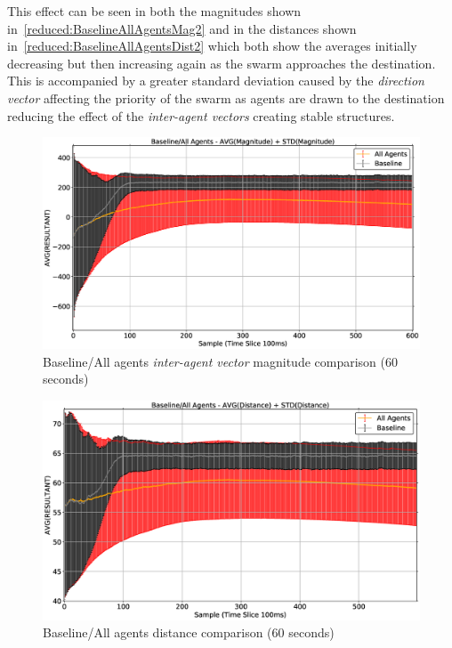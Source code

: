 This effect can be seen in both the magnitudes shown in~\autoref{reduced:BaselineAllAgentsMag2} and in the distances shown in~\autoref{reduced:BaselineAllAgentsDist2} which both show the averages initially decreasing but then increasing again as the swarm approaches the destination. This is accompanied by a greater standard deviation caused by the \textit{direction vector} affecting the priority of the swarm as agents are drawn to the destination reducing the effect of the \textit{inter-agent vectors} creating stable structures.
\begin{figure}[H]
\begin{center}
\includegraphics[width=14cm]{CHAPTER-6/figures/BaselineAllAgentsMag2}
\end{center}
\caption[Baseline/All agents magnitude comparison]{Baseline/All agents \textit{inter-agent vector} magnitude comparison (60 seconds)\label{reduced:BaselineAllAgentsMag2}}
\end{figure}
\begin{figure}[H]
\begin{center}
\includegraphics[width=14cm]{CHAPTER-6/figures/BaselineAllAgentsDist2}
\end{center}
\caption{Baseline/All agents distance comparison (60 seconds)\label{reduced:BaselineAllAgentsDist2}}
\end{figure}

